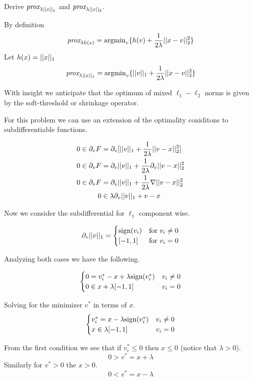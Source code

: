\documentclass[11pt, answers]{exam}
\begin{document}
\begin{questions}

	\question Derive $\textit{prox}_{\lambda|| x ||_1}$ and $\textit{prox}_{\lambda|| x ||_2}$.

	\begin{solution}

		By definition
		$$\textit{prox}_{\lambda h(x)}=\text{argmin}_v\{h(v)+\frac{1}{2\lambda}|| x-v ||_2^2\}$$
		Let $h(x)=|| x ||_1$
		$$\textit{prox}_{\lambda || x ||_1}=\text{argmin}_v\{|| v ||_1+\frac{1}{2\lambda}|| x-v ||_2^2\}$$

		With insight we anticipate that the optimum of mixed $\ell_1-\ell_2$ norms is given by the soft-threshold or shrinkage operator.

		For this problem we can use an extension of the optimality coniditons to subdifferentiable functions.

		\begin{align*}
		0\in \partial_v F &= \partial_v [|| v ||_1 +\frac{1}{2\lambda}|| v-x ||_2^2]\\
		0\in \partial_v F &= \partial_v || v ||_1 +\frac{1}{2\lambda}\partial_v || v-x ||_2^2\\
		0\in \partial_v F &= \partial_v || v ||_1 +\frac{1}{2\lambda}\nabla || v-x ||_2^2\\
		0&\in  \lambda \partial_v || v ||_1 +v-x
		\end{align*}

		Now we consider the subdifferential for $\ell_1$ component wise.

		$$\partial_v || v ||_1 = \begin{cases} \text{sign}(v_i) &\text{for }v_i\neq 0 \\
				[-1,1] & \text{for } v_i=0\end{cases}$$

		Analyzing both cases we have the following.

		$$\begin{cases}0=v_i^*-x+\lambda\text{sign}(v_i^*) & v_i\neq 0\\
			0\in x+\lambda[-1,1] & v_i= 0
		\end{cases}$$

		Solving for the minimizer $v^*$ in terms of $x$.
		$$\begin{cases}v_i^*=x-\lambda\text{sign}(v_i^*) & v_i\neq 0\\
			x\in\lambda[-1,1] & v_i= 0
		\end{cases}$$

		From the first condition we see that if $v_i^*\leq 0$ then $x\leq 0$ (notice that $\lambda>0$).
		$$0>v^* = x+\lambda$$
		Similarly for $v^*>0$ the $x>0$.
		$$0<v^* = x-\lambda$$


\end{solution}
\end{questions}
\end{document}
